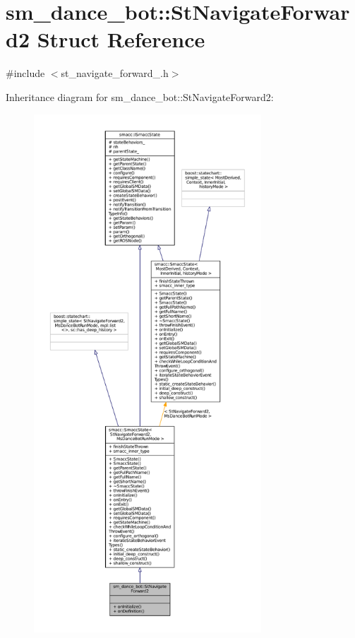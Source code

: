 \hypertarget{structsm__dance__bot_1_1StNavigateForward2}{}\section{sm\+\_\+dance\+\_\+bot\+:\+:St\+Navigate\+Forward2 Struct Reference}
\label{structsm__dance__bot_1_1StNavigateForward2}


{\ttfamily \#include $<$st\+\_\+navigate\+\_\+forward\+\_.\+h$>$}



Inheritance diagram for sm\+\_\+dance\+\_\+bot\+:\+:St\+Navigate\+Forward2\+:
\nopagebreak
\begin{figure}[H]
\begin{center}
\leavevmode
\includegraphics[height=550pt]{structsm__dance__bot_1_1StNavigateForward2__inherit__graph}
\end{center}
\end{figure}


